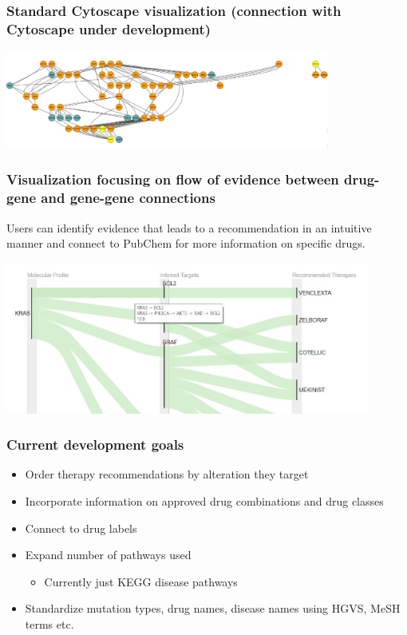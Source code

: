 \documentclass{beamer}
\begin{document}

\begin{frame}
\frametitle{Standard Cytoscape visualization (connection with Cytoscape under development)}

\includegraphics[width=0.80\textwidth, center]{Visualization_cytoscape.jpg}

\end{frame}


\begin{frame}
\frametitle{Visualization focusing on flow of evidence between drug-gene and gene-gene connections}

Users can identify evidence that leads to a recommendation in an intuitive manner and connect to PubChem for more information on specific drugs.

\includegraphics[width=0.90\textwidth, center]{Visualization_prototype.jpg}

\end{frame}



\begin{frame}
\frametitle{Current development goals}

\begin{itemize}
\item Order therapy recommendations by alteration they target
\item Incorporate information on approved drug combinations and drug classes
\item Connect to drug labels
\item Expand number of pathways used
\begin{itemize}
\item Currently just KEGG disease pathways
\end{itemize}
\item Standardize mutation types, drug names, disease names using HGVS, MeSH terms etc.
\end{itemize}

\end{frame}
\end{document}

